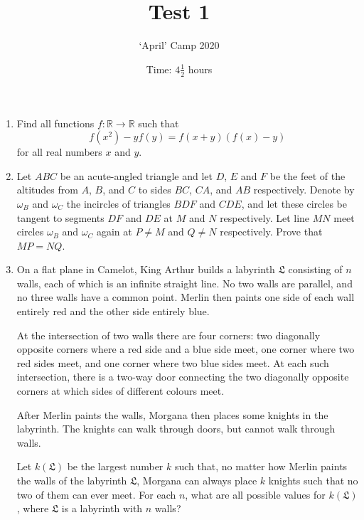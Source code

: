 \documentclass[11pt]{article}
\title{Test 1}
\author{`April' Camp 2020}
\date{Time: $4\frac{1}{2}$ hours}
\begin{document}
\maketitle
\thispagestyle{empty}


\begin{enumerate}[1.]

\vfill
\item %
Find all functions $f : \mathbb{R} \to \mathbb{R}$ such that
\[ f(x^2) -yf(y) = f(x+y)(f(x)-y) \]
for all real numbers $x$ and $y$.


\vfill
\item %
Let $ABC$ be an acute-angled triangle and let $D$, $E$ and $F$ be the feet of the altitudes from $A$, $B$, and $C$ to sides $BC$, $CA$, and $AB$ respectively.
Denote by $\omega_B$ and $\omega_C$ the incircles of triangles $BDF$ and $CDE$, and let these circles be tangent to segments $DF$ and $DE$ at $M$ and $N$ respectively.
Let line $MN$ meet circles $\omega_B$ and $\omega_C$ again at $P \neq M$ and $Q \neq N$ respectively.
Prove that $MP = NQ$.


\vfill
\item %
\newcommand{\LL}{\mathfrak{L}}
On a flat plane in Camelot, King Arthur builds a labyrinth $\LL$ consisting of $n$ walls, each of which is an infinite straight line.
No two walls are parallel, and no three walls have a common point.
Merlin then paints one side of each wall entirely red and the other side entirely blue.

At the intersection of two walls there are four corners: two diagonally opposite corners where a red side and a blue side meet, one corner where two red sides meet, and one corner where two blue sides meet.
At each such intersection, there is a two-way door connecting the two diagonally opposite corners at which sides of different colours meet.

After Merlin paints the walls, Morgana then places some knights in the labyrinth.
The knights can walk through doors, but cannot walk through walls.

Let $k(\LL)$ be the largest number $k$ such that, no matter how Merlin paints the walls of the labyrinth $\LL$, Morgana can always place $k$ knights such that no two of them can ever meet.
For each $n$, what are all possible values for $k(\LL)$, where $\LL$ is a labyrinth with $n$ walls?

\vfill
\end{enumerate}


\vfill
\centering
\begin{BVerbatim}
\end{BVerbatim}
\end{document}
